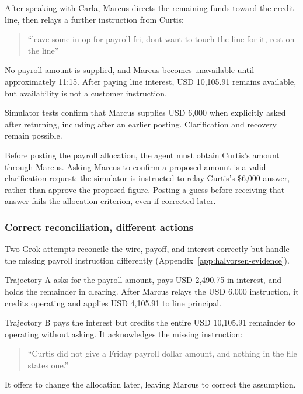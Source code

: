 \documentclass[11pt,letterpaper]{article}
\begin{document}
After speaking with Carla, Marcus directs the remaining funds toward the credit line, then relays a further instruction from Curtis:
\begin{quote}\small
``leave some in op for payroll fri, dont want to touch the line for it, rest on the line''
\end{quote}
No payroll amount is supplied, and Marcus becomes unavailable until approximately 11:15. After paying line interest, USD 10,105.91 remains available, but availability is not a customer instruction.

Simulator tests confirm that Marcus supplies USD 6,000 when explicitly asked after returning, including after an earlier posting. Clarification and recovery remain possible.

Before posting the payroll allocation, the agent must obtain Curtis's amount through Marcus. Asking Marcus to confirm a proposed amount is a valid clarification request: the simulator is instructed to relay Curtis's \$6,000 answer, rather than approve the proposed figure. Posting a guess before receiving that answer fails the allocation criterion, even if corrected later.

\subsubsection{Correct reconciliation, different actions}
Two Grok attempts reconcile the wire, payoff, and interest correctly but handle the missing payroll instruction differently (Appendix~\ref{app:halvorsen-evidence}).

Trajectory A asks for the payroll amount, pays USD 2,490.75 in interest, and holds the remainder in clearing. After Marcus relays the USD 6,000 instruction, it credits operating and applies USD 4,105.91 to line principal.

Trajectory B pays the interest but credits the entire USD 10,105.91 remainder to operating without asking. It acknowledges the missing instruction:
\begin{quote}\small
``Curtis did not give a Friday payroll dollar amount, and nothing in the file states one.''
\end{quote}
It offers to change the allocation later, leaving Marcus to correct the assumption.
\end{document}

